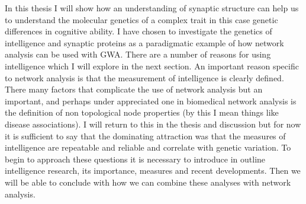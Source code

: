  
In this thesis I will show how an understanding of synaptic structure can help us to understand the molecular genetics of a complex trait in this case genetic differences in cognitive ability. I have chosen to investigate the genetics of intelligence and synaptic proteins as a paradigmatic example of how network analysis can be used with GWA. There are a number of reasons for using intelligence which I will explore in the next section. An important reason specific to network analysis is that the measurement of intelligence is clearly defined. There  many factors that complicate the use of network analysis but an important, and perhaps under appreciated one in biomedical network analysis is the definition of non topological node properties (by this I mean things like disease associations). I will return to this in the thesis and discussion but for now it is sufficient to say that the dominating attraction was that the measures of intelligence are repeatable and reliable and correlate with genetic variation. To begin to approach these questions it is necessary to introduce in outline intelligence research, its importance, measures and recent developments. Then we will be able to conclude with how we can combine these analyses with network analysis.%





































































